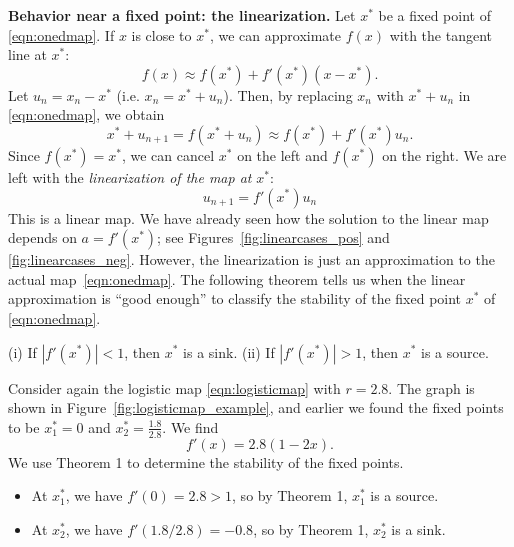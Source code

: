 \noindent
\textbf{Behavior near a fixed point: the linearization.}
Let $x^*$ be a fixed point of \eqref{eqn:onedmap}.
If $x$ is close to $x^*$,
we can approximate $f(x)$ with the tangent line at $x^*$:
\begin{equation}
   f(x) \approx f(x^*) + f'(x^*)(x-x^*).
\end{equation}
Let $u_n = x_n-x^*$ (i.e. $x_n = x^* + u_n$).
Then, by replacing $x_n$ with $x^*+u_n$
in \eqref{eqn:onedmap}, we obtain
\begin{equation}
  x^* + u_{n+1} = f(x^*+u_n) \approx f(x^*)+f'(x^*)u_n.
\end{equation}
Since $f(x^*)=x^*$, we can cancel $x^*$ on the left
and $f(x^*)$ on the right.
We are left with the
\emph{linearization of the map at } $x^*$:
\begin{equation}
  u_{n+1} = f'(x^*)u_n
\end{equation}
This is a linear map.
We have already seen how the solution to the linear
map depends on $a=f'(x^*)$; see Figures~\ref{fig:linearcases_pos}
and \ref{fig:linearcases_neg}.
However, the linearization is just an approximation
to the actual map~\eqref{eqn:onedmap}.
The following theorem tells us when the linear approximation
is ``good enough'' to classify the stability of the
fixed point $x^*$ of \eqref{eqn:onedmap}.

\begin{theorem}
(i) If $|f'(x^*)| < 1$, then $x^*$ is a sink.
(ii) If $|f'(x^*)| > 1$, then $x^*$ is a source.
\end{theorem}

\begin{xexample}
Consider again the logistic map \eqref{eqn:logisticmap}
with $r=2.8$.  The graph is shown in
Figure~\ref{fig:logisticmap_example}, and earlier we found the
fixed points to be $x^*_1=0$ and $x^*_2=\frac{1.8}{2.8}$.
We find
\begin{equation}
  f'(x) = 2.8(1-2x).
\end{equation}
We use Theorem 1 to determine the stability of the fixed points.
\begin{itemize}
\item
At $x^*_1$, we have $f'(0) = 2.8 > 1$, so by Theorem 1,
$x^*_1$ is a source.
\item
At $x^*_2$, we have $f'(1.8/2.8) = -0.8$,
so by Theorem 1,
$x^*_2$ is a sink.
\end{itemize}
\end{xexample}

